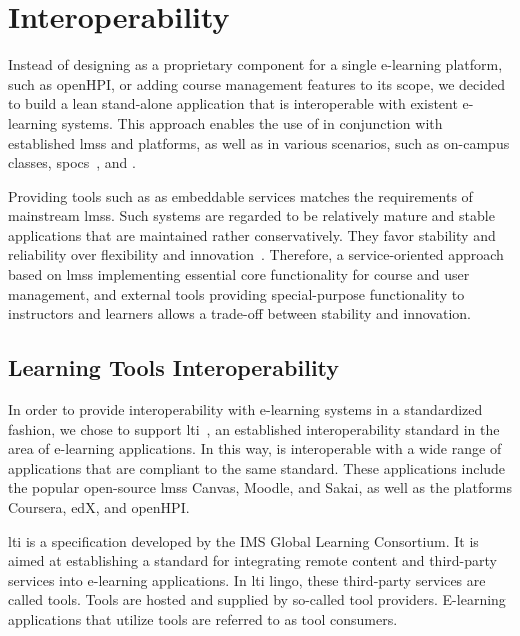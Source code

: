 \section{Interoperability}\label{section:interoperability1}

Instead of designing \tool as a proprietary component for a single e-learning platform, such as openHPI, or adding course management features to its scope, we decided to build a lean stand-alone application that is interoperable with existent e-learning systems. This approach enables the use of \tool in conjunction with established \glspl{lms} and \mooc platforms, as well as in various scenarios, such as on-campus classes, \glspl{spoc}~\cite{fox2014software}, and \moocs.

Providing tools such as \tool as embeddable services matches the requirements of mainstream \glspl{lms}. Such systems are regarded to be relatively mature and stable applications that are maintained rather conservatively. They favor stability and reliability over flexibility and innovation~\cite{severance2010ims}. Therefore, a service-oriented approach based on \glspl{lms} implementing essential core functionality for course and user management, and external tools providing special-purpose functionality to instructors and learners allows a trade-off between stability and innovation.

\subsection{Learning Tools Interoperability}

In order to provide interoperability with e-learning systems in a standardized fashion, we chose to support \gls{lti}~\cite{severance2010ims}, an established interoperability standard in the area of e-learning applications. In this way, \tool is interoperable with a wide range of applications that are compliant to the same standard. These applications include the popular open-source \glspl{lms} Canvas, Moodle, and Sakai, as well as the \mooc platforms Coursera, edX, and openHPI.

\Gls{lti} is a specification developed by the IMS Global Learning Consortium. It is aimed at establishing a standard for integrating remote content and third-party services into e-learning applications. In \gls{lti} lingo, these third-party services are called tools. Tools are hosted and supplied by so-called tool providers. E-learning applications that utilize tools are referred to as tool consumers.

